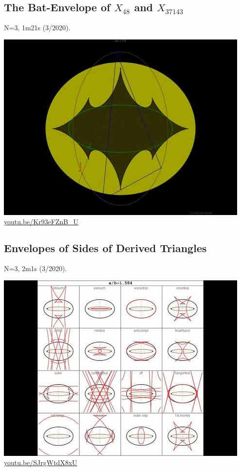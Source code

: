 \documentclass[12pt]{amsart}
\begin{document}
\subsection{The Bat-Envelope of $X_{48}$ and $X_{37143}$}
\label{vid:Kr93eFZnB_U}
\noindent N=3, 1m21s (3/2020). 
\begin{center}\includegraphics[width=.5\textwidth]{pics/Kr93eFZnB_U.jpg} \\ 
\href{https://youtu.be/Kr93eFZnB_U}{\url{youtu.be/Kr93eFZnB\_U}}\end{center}
% 

\subsection{Envelopes of Sides of Derived Triangles}
\label{vid:SJrgWtdX8xU}
\noindent N=3, 2m1s (3/2020). 
\begin{center}\includegraphics[width=.5\textwidth]{pics/SJrgWtdX8xU.jpg} \\ 
\href{https://youtu.be/SJrgWtdX8xU}{\url{youtu.be/SJrgWtdX8xU}}\end{center}
% 
\end{document}
